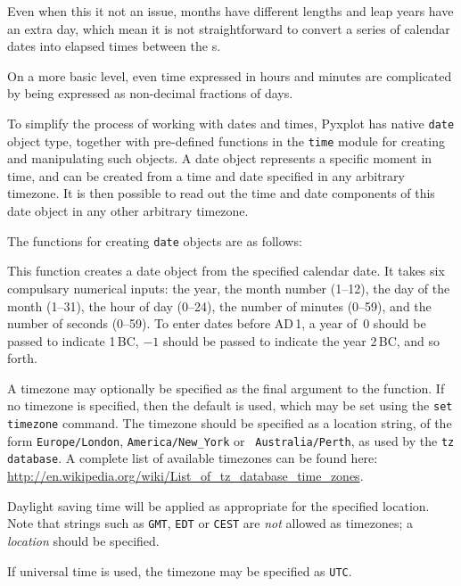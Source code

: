 Even when this it not an issue, months have different lengths and leap years
have an extra day, which mean it is not straightforward to convert a series of
calendar dates into elapsed times between the \datapoint s.

On a more basic level, even time expressed in hours and minutes are complicated
by being expressed as non-decimal fractions of days.

To simplify the process of working with dates and times, Pyxplot has native
{\tt date} object type, together with pre-defined functions in the {\tt time}
module for creating and manipulating such objects.  A date object represents a
specific moment in time, and can be created from a time and date specified in
any arbitrary timezone. It is then possible to read out the time and date
components of this date object in any other arbitrary timezone.

The functions for creating {\tt date} objects are as follows:

\vspace{2mm}\vspace{2mm}

\noindent This function creates a date object from the specified calendar date.
It takes six compulsary numerical inputs: the year, the month number (1--12),
the day of the month (1--31), the hour of day (0--24), the number of minutes
(0--59), and the number of seconds (0--59). To enter dates before
{\footnotesize AD}\,1, a year of~$0$ should be passed to indicate
1\,{\footnotesize BC}, $-1$ should be passed to indicate the year
2\,{\footnotesize BC}, and so forth.

A timezone may optionally be specified as the final argument to the function.
If no timezone is specified, then the default is used, which may be set using
the {\tt set timezone} command. The timezone should be specified as a location string,
of the form {\tt Europe/London}, {\tt America/New\_York} or {\tt
Australia/Perth}, as used by the {\tt tz database}. A complete list of
available timezones can be found here:
\url{http://en.wikipedia.org/wiki/List_of_tz_database_time_zones}.

Daylight saving time will be applied as appropriate for the specified location.
Note that strings such as {\tt GMT}, {\tt EDT} or {\tt CEST} are {\it not}
allowed as timezones; a {\it location} should be specified.

If universal time is used, the timezone may be specified as {\tt UTC}.

